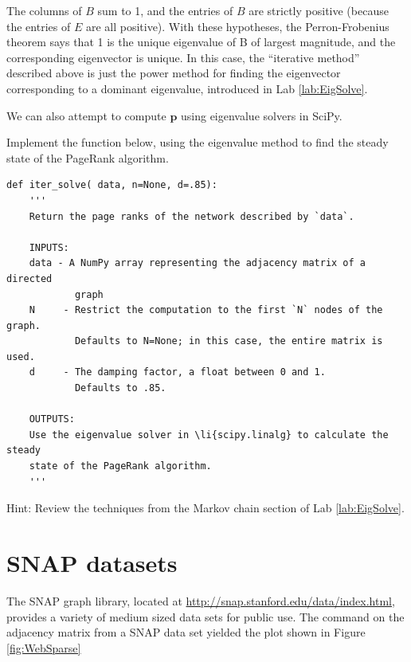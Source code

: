 The columns of $B$ sum to 1, and the entries of $B$ are strictly positive (because the entries of $E$ are all positive).
With these hypotheses, the Perron-Frobenius theorem says that 1 is the unique eigenvalue of B of largest magnitude, and the corresponding eigenvector is unique.
In this case, the ``iterative method'' described above is just the power method for finding the eigenvector corresponding to a dominant eigenvalue, introduced in Lab \ref{lab:EigSolve}.

We can also attempt to compute $\mathbf{p}$ using eigenvalue solvers in SciPy.

\begin{problem}
Implement the function below, using the eigenvalue method to find the steady state of the PageRank algorithm.
\begin{lstlisting}
def iter_solve( data, n=None, d=.85):
    '''
    Return the page ranks of the network described by `data`.
    
    INPUTS:
    data - A NumPy array representing the adjacency matrix of a directed 
            graph
    N     - Restrict the computation to the first `N` nodes of the graph. 
            Defaults to N=None; in this case, the entire matrix is used.
    d     - The damping factor, a float between 0 and 1. 
            Defaults to .85.
    
    OUTPUTS:
    Use the eigenvalue solver in \li{scipy.linalg} to calculate the steady 
    state of the PageRank algorithm.
    '''
\end{lstlisting}
Hint: Review the techniques from the Markov chain section of Lab \ref{lab:EigSolve}.
\end{problem}


\section*{SNAP datasets}
The SNAP graph library, located at \url{http://snap.stanford.edu/data/index.html}, provides a variety of medium sized data sets for public use.
The  command on the adjacency matrix from a SNAP data set yielded the plot shown in Figure \ref{fig:WebSparse}

